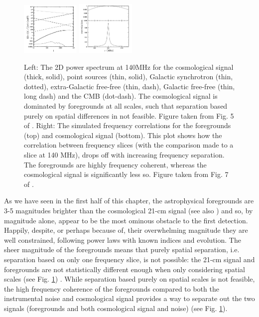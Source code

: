 \begin{figure}
\begin{center}
    \includegraphics[width=0.25\textwidth]{Images/santos_spat.png}
    \includegraphics[width=0.25\textwidth]{Images/santos_freq.png}
\end{center}
    \caption{Left: The 2D power spectrum at 140MHz for the cosmological signal (thick, solid), point sources (thin, solid), Galactic synchrotron (thin, dotted), extra-Galactic free-free (thin, dash), Galactic free-free (thin, long dash) and the CMB (dot-dash). The cosmological signal is dominated by foregrounds at all scales, such that separation based purely on spatial differences in not feasible. Figure taken from Fig. 5 of \citet{Santos2005ApJ...625..575S}. Right: The simulated frequency correlations for the foregrounds (top) and cosmological signal (bottom). This plot shows how the correlation between frequency slices (with the comparison made to a slice at 140 MHz), drops off with increasing frequency separation. The foregrounds are highly frequency coherent, whereas the cosmological signal is significantly less so. Figure taken from Fig. 7 of \citet{Santos2005ApJ...625..575S}.}
    \label{fig:santos_spatial}
\end{figure}

As we have seen in the first half of this chapter, the astrophysical foregrounds are 3-5 magnitudes brighter than the cosmological 21-cm signal (see also \citet{Bernardi2010A&A...522A..67B,Jelic2008MNRAS.389.1319J}) and so, by magnitude alone, appear to be the most ominous obstacle to the first detection. Happily, despite, or perhaps because of, their overwhelming magnitude they are well constrained, following power laws with known indices and evolution. The sheer magnitude of the foregrounds means that purely spatial separation, i.e. separation based on only one frequency slice, is not possible: the 21-cm signal and foregrounds are not statistically different enough when only considering spatial scales (see Fig. \ref{fig:santos_spatial}) \citep{DiMatteo2004MNRAS.355.1053D,Oh2003MNRAS.346..871O,DiMatteo2002ApJ...564..576D}. While separation based purely on spatial scales is not feasible, the high frequency coherence of the foregrounds compared to both the instrumental noise and cosmological signal provides a way to separate out the two signals (foregrounds and both cosmological signal and noise) (see Fig. \ref{fig:santos_spatial}). 

